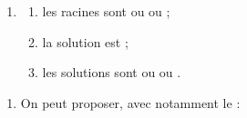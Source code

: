 \documentclass[a4paper,11pt]{article}
\begin{document}
\begin{enumerate}
\begin{center}
	\end{center}
	\item 
	\begin{enumerate}
		\item les racines sont  ou  ou  ;
		\item la solution est  ;
		\item les solutions sont  ou  ou .
	\end{enumerate}
\end{enumerate}

\medskip


\begin{enumerate}
	\item On peut proposer, avec notamment le  :
	\begin{center}

\end{center}
\end{enumerate}
\end{document}
